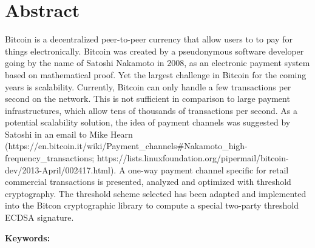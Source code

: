 \chapter*{Abstract}

Bitcoin is a decentralized peer-to-peer currency that allow users to to pay for
things electronically. Bitcoin was created by a pseudonymous software developer going by the name of
Satoshi Nakamoto in 2008, as an electronic payment system based on mathematical proof.
Yet the largest challenge in Bitcoin for the coming years is scalability.
Currently, Bitcoin can only handle a few transactions per second on the network.
This is not sufficient in comparison to large payment infrastructures, which allow tens of
thousands of transactions per second. As a potential scalability solution, the idea of payment channels was suggested by Satoshi in an email to Mike Hearn (https://en.bitcoin.it/wiki/Payment_channels#Nakamoto_high-frequency_transactions; https://lists.linuxfoundation.org/pipermail/bitcoin-dev/2013-April/002417.html).
A one-way payment channel specific for retail commercial transactions is presented, analyzed and optimized with
threshold cryptography. The threshold scheme selected has been adapted and implemented
into the Bitcon cryptographic library to compute a special two-party threshold ECDSA signature.

\vskip0.5cm
\noindent\textbf{Keywords:}
\Keywords
